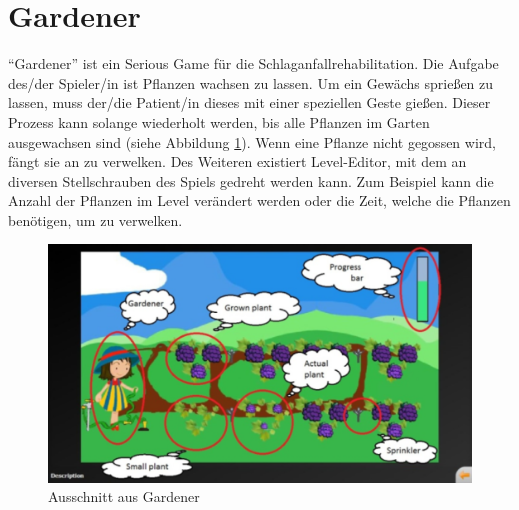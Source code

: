 \section{Gardener}\label{sec:gardener}
\enquote{Gardener} ist ein Serious Game für die Schlaganfallrehabilitation. Die Aufgabe des/der Spieler/in ist Pflanzen wachsen zu lassen. Um ein Gewächs sprießen zu lassen, muss der/die Patient/in dieses mit einer speziellen Geste gießen. Dieser Prozess kann solange wiederholt werden, bis alle Pflanzen im Garten ausgewachsen sind (siehe Abbildung \ref{fig:gardener}). Wenn eine Pflanze nicht gegossen wird, fängt sie an zu verwelken. Des Weiteren existiert Level-Editor, mit dem an diversen Stellschrauben des Spiels gedreht werden kann. Zum Beispiel kann die Anzahl der Pflanzen im Level verändert werden oder die Zeit, welche die Pflanzen benötigen, um zu verwelken. \cite{miesenberger:2014:gardener}

\begin{figure}[h]
    \centering
	\includegraphics[width=0.8\linewidth]{figures/state_of_the_art/gardener}
	\caption{Ausschnitt aus Gardener \cite{miesenberger:2014:gardener}}
	\label{fig:gardener}
\end{figure}


